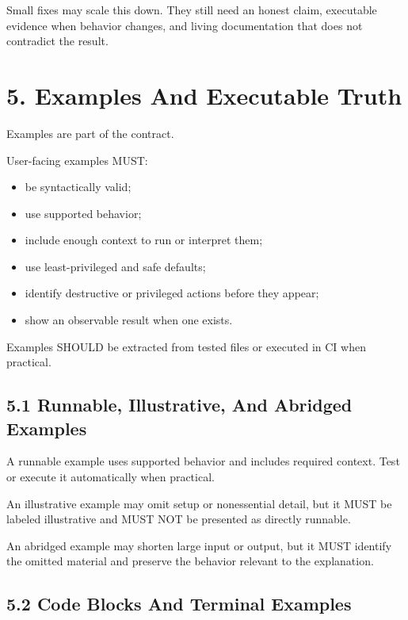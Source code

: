 Small fixes may scale this down. They still need an honest claim, executable evidence when behavior changes, and living documentation that does not contradict the result.

\section{5. Examples And Executable Truth}\label{record-005-examples-and-executable-truth}

Examples are part of the contract.

User-facing examples MUST:

\begin{itemize}
\tightlist
\item
  be syntactically valid;
\item
  use supported behavior;
\item
  include enough context to run or interpret them;
\item
  use least-privileged and safe defaults;
\item
  identify destructive or privileged actions before they appear;
\item
  show an observable result when one exists.
\end{itemize}

Examples SHOULD be extracted from tested files or executed in CI when practical.

\subsection{5.1 Runnable, Illustrative, And Abridged Examples}\label{record-005-runnable-illustrative-and-abridged-examples}

A runnable example uses supported behavior and includes required context. Test or execute it automatically when practical.

An illustrative example may omit setup or nonessential detail, but it MUST be labeled illustrative and MUST NOT be presented as directly runnable.

An abridged example may shorten large input or output, but it MUST identify the omitted material and preserve the behavior relevant to the explanation.

\subsection{5.2 Code Blocks And Terminal Examples}\label{record-005-code-blocks-and-terminal-examples}

